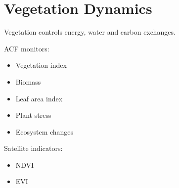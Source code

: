 \section{Vegetation Dynamics}


Vegetation controls energy, water and carbon exchanges.



ACF monitors:


\begin{itemize}

\item Vegetation index

\item Biomass

\item Leaf area index

\item Plant stress

\item Ecosystem changes

\end{itemize}



Satellite indicators:


\begin{itemize}

\item NDVI

\item EVI

\end{itemize}
